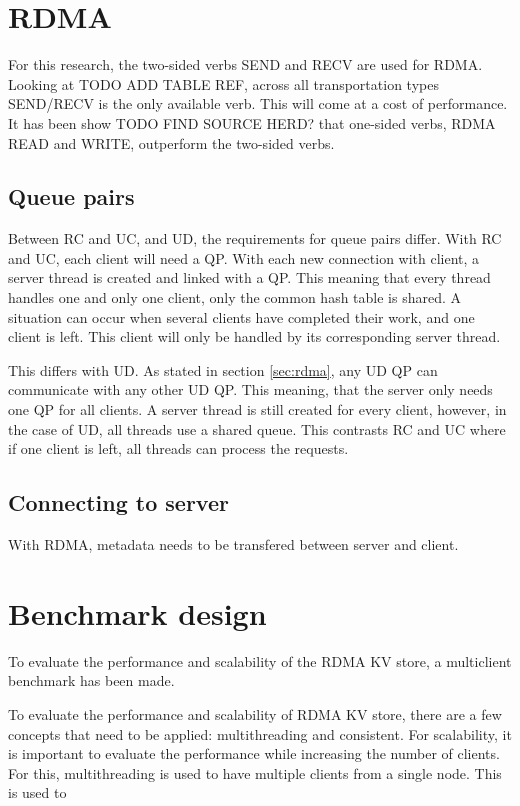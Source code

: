 \section{RDMA}
For this research, the two-sided verbs SEND and RECV are used for RDMA.
Looking at TODO ADD TABLE REF, across all transportation types SEND/RECV is the only available verb.
This will come at a cost of performance.
It has been show TODO FIND SOURCE HERD? that one-sided verbs, RDMA READ and WRITE, outperform the two-sided verbs.

\subsection{Queue pairs}
Between RC and UC, and UD, the requirements for queue pairs differ.
With RC and UC, each client will need a QP.
With each new connection with client, a server thread is created and linked with a QP.
This meaning that every thread handles one and only one client, only the common hash table is shared.
A situation can occur when several clients have completed their work, and one client is left.
This client will only be handled by its corresponding server thread.

This differs with UD.
As stated in section \ref{sec:rdma}, any UD QP can communicate with any other UD QP.
This meaning, that the server only needs one QP for all clients.
A server thread is still created for every client, however, in the case of UD, all threads use a shared queue.
This contrasts RC and UC where if one client is left, all threads can process the requests.

\subsection{Connecting to server}
With RDMA, metadata needs to be transfered between server and client.



\section{Benchmark design}
To evaluate the performance and scalability of the RDMA KV store, a multiclient benchmark has been made.



To evaluate the performance and scalability of RDMA KV store, there are a few concepts that need to be applied: multithreading and consistent.
For scalability, it is important to evaluate the performance while increasing the number of clients.
For this, multithreading is used to have multiple clients from a single node.
This is used to

